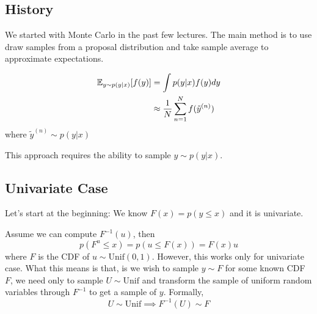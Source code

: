 \documentclass{article}
\begin{document}

\subsection{History} 
We started with Monte Carlo in the past few lectures. The main method is to use draw samples from a proposal distribution and take sample average to approximate expectations.



\begin{align*}
    \mathbb{E}_{y \sim p(y|x)}[f(y)] & = \int p(y|x) f(y) dy \\
    & \approx \frac{1}{N} \sum_{n=1}^{N} f(\tilde{y}^{(n)})
\end{align*}
where $\tilde{y}^{(n)} \sim p(y|x)$

This approach requires the ability to sample $y \sim p(y|x)$.

\subsection{Univariate Case}
Let's start at the beginning:  We know $F(x) = p(y \leq x)$ and it is univariate. 





Assume we can compute $F^{-1}(u)$, then 
$$ p(F^{u}\leq x) = p(u\leq F(x)) = F(x) u$$
where $F$ is the CDF of $u \sim \text{Unif}(0,1)$. However, this works only for univariate case. What this means is that, is we wish to sample $y \sim F$ for some known CDF $F$, we need only to sample $U\sim \text{Unif}$ and transform the sample of uniform random variables through $F^{-1}$ to get a sample of $y$. Formally, \[
U \sim \text{Unif} \implies F^{-1}(U) \sim F \tag{This is known as the probability integral transform}
\]
\end{document}
